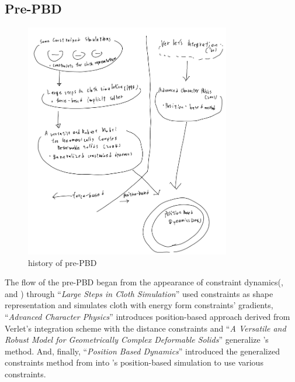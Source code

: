 \documentclass[pdflatex,sn-mathphys-num]{sn-jnl}%
\theoremstyle{thmstyleone}%
\theoremstyle{thmstyletwo}%
\theoremstyle{thmstylethree}%
\newcommand{\mainpname}[1]{``{\sl {#1}}''}
\begin{document}
\subsection{Pre-PBD}
\begin{figure}[h]
\centering
\includegraphics[width=0.8\textwidth]{images/prePBD.png}
\caption{history of pre-PBD}
\label{prePBD}
\end{figure}

The flow of the pre-PBD began from the appearance of constraint dynamics(\cite{EnergyWitkin1987}, \cite{ConstrainedBarzel} and \cite{ConstrainedPlatt}) through \mainpname{Large Steps in Cloth Simulation}\cite{LargeStepBaraff} used \gls{constraint}s as shape representation and simulates cloth with energy form \gls{constraint}s' gradients, \mainpname{Advanced Character Physics}\cite{Jakobsen2003AdvancedCP} introduces position-based approach derived from Verlet's integration scheme with the distance constraints and \mainpname{A Versatile and Robust Model for Geometrically Complex Deformable Solids}\cite{VersatileTeschner} generalize \cite{LargeStepBaraff}'s method.
And, finally, \mainpname{Position Based Dynamics}\cite{PBD} introduced the generalized constraints method from \cite{VersatileTeschner} into \cite{Jakobsen2003AdvancedCP}'s position-based simulation to use various \gls{constraint}s.
\end{document}
